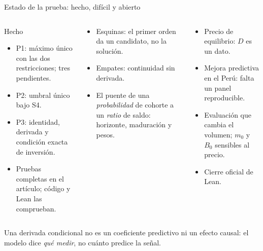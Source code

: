 \documentclass[aspectratio=169,10pt,t]{beamer}
\begin{document}
\begin{frame}{Estado de la prueba: hecho, difícil y abierto}
\begin{columns}[T,onlytextwidth]
\begin{propbox}{Hecho}
\small
\begin{itemize}\setlength{\itemsep}{.8mm}
\item P1: máximo único con las dos restricciones; tres pendientes.
\item P2: umbral único bajo S4.
\item P3: identidad, derivada y condición exacta de inversión.
\item Pruebas completas en el artículo; código y Lean las comprueban.
\end{itemize}
\end{propbox}
\begin{tcolorbox}[enhanced,colback=accent!7,colframe=accent,boxrule=.5pt,arc=1.2pt,
  left=2.2mm,right=2.2mm,top=1mm,bottom=1mm,title={Lo difícil},
  fonttitle=\bfseries\small,boxsep=.6mm,toptitle=.3mm,bottomtitle=.3mm]
\small
\begin{itemize}\setlength{\itemsep}{.8mm}
\item Esquinas: el primer orden da un candidato, no la solución.
\item Empates: continuidad sin derivada.
\item El puente de una \emph{probabilidad} de cohorte a un \emph{ratio} de saldo:
horizonte, maduración y pesos.
\end{itemize}
\end{tcolorbox}
\begin{tcolorbox}[enhanced,colback=paper,colframe=soft,boxrule=.5pt,arc=1.2pt,
  left=2.2mm,right=2.2mm,top=1mm,bottom=1mm,title={Abierto},
  fonttitle=\bfseries\small,boxsep=.6mm,toptitle=.3mm,bottomtitle=.3mm]
\small
\begin{itemize}\setlength{\itemsep}{.8mm}
\item Precio de equilibrio: $D$ es un dato.
\item Mejora predictiva en el Perú: falta un panel reproducible.
\item Evaluación que cambia el volumen; $m_{0}$ y $B_{0}$ sensibles al precio.
\item Cierre oficial de Lean.
\end{itemize}
\end{tcolorbox}
\end{columns}
\vspace{1mm}
{\small Una derivada condicional no es un coeficiente predictivo ni un efecto causal:
el modelo dice \emph{qué medir}, no cuánto predice la señal.\par}
\end{frame}
\end{document}
